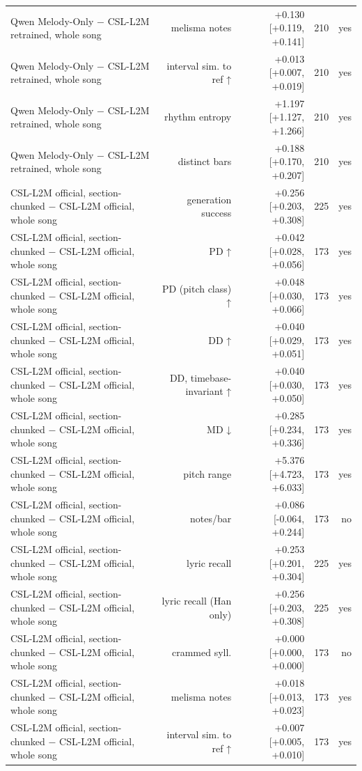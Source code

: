 \begin{table}[t]
\begin{tabular}{lrrrr}
Qwen Melody-Only $-$ CSL-L2M retrained, whole song & melisma notes & +0.130 [+0.119, +0.141] & 210 & yes \\
Qwen Melody-Only $-$ CSL-L2M retrained, whole song & interval sim. to ref ↑ & +0.013 [+0.007, +0.019] & 210 & yes \\
Qwen Melody-Only $-$ CSL-L2M retrained, whole song & rhythm entropy & +1.197 [+1.127, +1.266] & 210 & yes \\
Qwen Melody-Only $-$ CSL-L2M retrained, whole song & distinct bars & +0.188 [+0.170, +0.207] & 210 & yes \\
CSL-L2M official, section-chunked $-$ CSL-L2M official, whole song & generation success & +0.256 [+0.203, +0.308] & 225 & yes \\
CSL-L2M official, section-chunked $-$ CSL-L2M official, whole song & PD ↑ & +0.042 [+0.028, +0.056] & 173 & yes \\
CSL-L2M official, section-chunked $-$ CSL-L2M official, whole song & PD (pitch class) ↑ & +0.048 [+0.030, +0.066] & 173 & yes \\
CSL-L2M official, section-chunked $-$ CSL-L2M official, whole song & DD ↑ & +0.040 [+0.029, +0.051] & 173 & yes \\
CSL-L2M official, section-chunked $-$ CSL-L2M official, whole song & DD, timebase-invariant ↑ & +0.040 [+0.030, +0.050] & 173 & yes \\
CSL-L2M official, section-chunked $-$ CSL-L2M official, whole song & MD ↓ & +0.285 [+0.234, +0.336] & 173 & yes \\
CSL-L2M official, section-chunked $-$ CSL-L2M official, whole song & pitch range & +5.376 [+4.723, +6.033] & 173 & yes \\
CSL-L2M official, section-chunked $-$ CSL-L2M official, whole song & notes/bar & +0.086 [-0.064, +0.244] & 173 & no \\
CSL-L2M official, section-chunked $-$ CSL-L2M official, whole song & lyric recall & +0.253 [+0.201, +0.304] & 225 & yes \\
CSL-L2M official, section-chunked $-$ CSL-L2M official, whole song & lyric recall (Han only) & +0.256 [+0.203, +0.308] & 225 & yes \\
CSL-L2M official, section-chunked $-$ CSL-L2M official, whole song & crammed syll. & +0.000 [+0.000, +0.000] & 173 & no \\
CSL-L2M official, section-chunked $-$ CSL-L2M official, whole song & melisma notes & +0.018 [+0.013, +0.023] & 173 & yes \\
CSL-L2M official, section-chunked $-$ CSL-L2M official, whole song & interval sim. to ref ↑ & +0.007 [+0.005, +0.010] & 173 & yes \\

\end{tabular}
\end{table}
